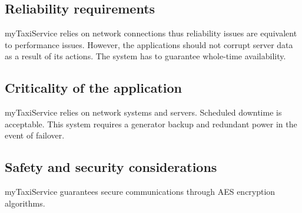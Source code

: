 
\subsection{Reliability requirements}
myTaxiService relies on network connections thus reliability issues are equivalent to performance issues.  However, the applications should not corrupt server data as a result of its actions. The system has to guarantee whole-time availability.

\subsection{Criticality of the application}
 myTaxiService relies on network systems and servers. Scheduled downtime is acceptable. This system requires a generator backup and redundant power in the event of failover.

\subsection{Safety and security considerations}
myTaxiService guarantees secure communications through AES encryption algorithms.